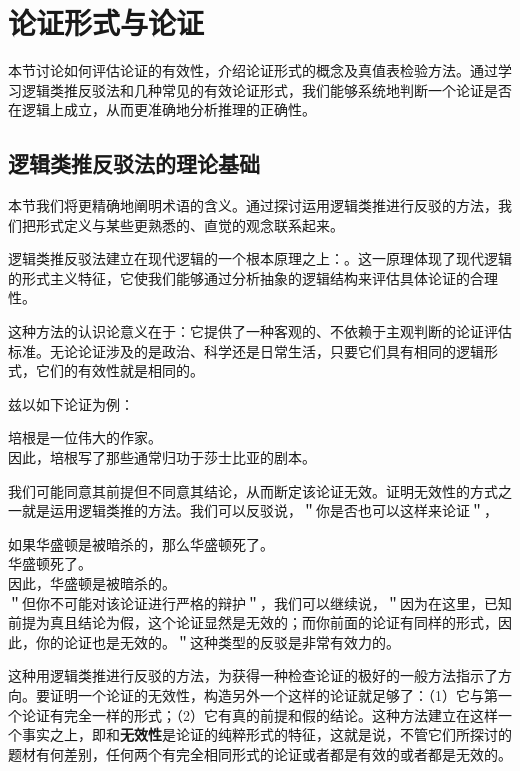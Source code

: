 \section{论证形式与论证}

\begin{logicbox}[title=引言]
本节讨论如何评估论证的有效性，介绍论证形式的概念及真值表检验方法。通过学习逻辑类推反驳法和几种常见的有效论证形式，我们能够系统地判断一个论证是否在逻辑上成立，从而更准确地分析推理的正确性。
\end{logicbox}

\subsection{逻辑类推反驳法的理论基础}

本节我们将更精确地阐明术语的含义。通过探讨运用逻辑类推进行反驳的方法，我们把形式定义与某些更熟悉的、直觉的观念联系起来。\cite{copi1980}

\begin{theorembox}[title=逻辑类推反驳法的哲学基础]
逻辑类推反驳法建立在现代逻辑的一个根本原理之上：。这一原理体现了现代逻辑的形式主义特征，它使我们能够通过分析抽象的逻辑结构来评估具体论证的合理性。

这种方法的认识论意义在于：它提供了一种客观的、不依赖于主观判断的论证评估标准。无论论证涉及的是政治、科学还是日常生活，只要它们具有相同的逻辑形式，它们的有效性就是相同的。
\end{theorembox}

兹以如下论证为例：

培根是一位伟大的作家。\\
因此，培根写了那些通常归功于莎士比亚的剧本。

我们可能同意其前提但不同意其结论，从而断定该论证无效。证明无效性的方式之一就是运用逻辑类推的方法。我们可以反驳说，＂你是否也可以这样来论证＂，

如果华盛顿是被暗杀的，那么华盛顿死了。\\
华盛顿死了。\\
因此，华盛顿是被暗杀的。\\
＂但你不可能对该论证进行严格的辩护＂，我们可以继续说，＂因为在这里，已知前提为真且结论为假，这个论证显然是无效的；而你前面的论证有同样的形式，因此，你的论证也是无效的。＂这种类型的反驳是非常有效力的。

这种用逻辑类推进行反驳的方法，为获得一种检查论证的极好的一般方法指示了方向。要证明一个论证的无效性，构造另外一个这样的论证就足够了：（1）它与第一个论证有完全一样的形式；（2）它有真的前提和假的结论。这种方法建立在这样一个事实之上，即和\textbf{无效性}是论证的纯粹形式的特征，这就是说，不管它们所探讨的题材有何差别，任何两个有完全相同形式的论证或者都是有效的或者都是无效的。\cite{jevons1886}


